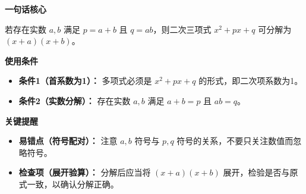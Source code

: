 \begin{summarybox}
	\textbf{\textcolor{CSummary}{一句话核心}}

	若存在实数 $a,b$ 满足 $p=a+b$ 且 $q=ab$，则二次三项式 $x^2+px+q$ 可分解为 $(x+a)(x+b)$。

	\medskip
	\textbf{\textcolor{CSummary}{使用条件}}
	\begin{itemize}[leftmargin=*, itemsep=0.5em, topsep=0.4em]
		\item \textbf{条件1（首系数为1）：} 多项式必须是 $x^2+px+q$ 的形式，即二次项系数为1。
		\item \textbf{条件2（实数分解）：} 存在实数 $a,b$ 满足 $a+b=p$ 且 $ab=q$。
	\end{itemize}

	\medskip
	\textbf{\textcolor{CSummary}{关键提醒}}
	\begin{itemize}[leftmargin=*, itemsep=0.5em, topsep=0.4em]
		\item \textbf{易错点（符号配对）：} 注意 $a,b$ 符号与 $p,q$ 符号的关系，不要只关注数值而忽略符号。
		\item \textbf{检查项（展开验算）：} 分解后应当将 $(x+a)(x+b)$ 展开，检验是否与原式一致，以确认分解正确。
	\end{itemize}
\end{summarybox}
